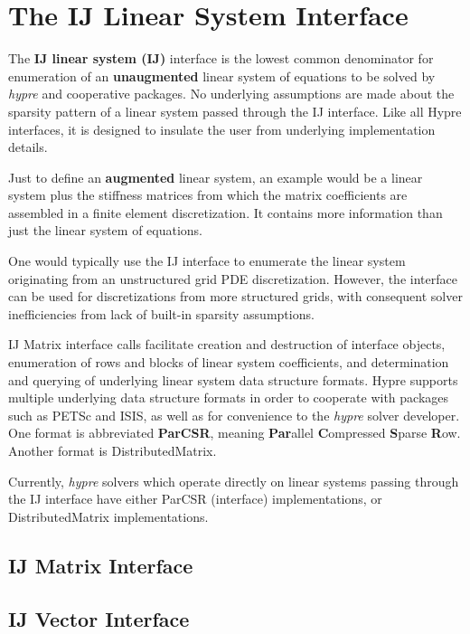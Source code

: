 \chapter{The IJ Linear System Interface}
\label{IJ}

The {\bf IJ linear system (IJ)} interface is the lowest common
denominator
for enumeration of an {\bf unaugmented} linear system of equations
to be solved by {\slshape hypre} and cooperative packages.
No underlying assumptions are made about the sparsity pattern of
a linear system passed through the IJ interface.
Like all Hypre interfaces, it is designed
to insulate the user from underlying implementation details.

Just to define an {\bf augmented} linear system, an example would be
a linear system plus the stiffness matrices from which the matrix
coefficients are assembled in a finite element discretization.
It contains more information than just the linear system
of equations.

One would typically use the IJ interface to enumerate the linear
system originating from an unstructured grid PDE discretization.
However, the interface can be used for discretizations from more
structured grids, with consequent solver inefficiencies from lack
of built-in sparsity assumptions.

IJ Matrix interface calls facilitate creation and destruction of 
interface objects, enumeration of rows and blocks of
linear system coefficients, and determination and querying of
underlying linear system data structure formats.  Hypre supports
multiple underlying data structure formats in order to cooperate
with packages such as PETSc and ISIS, as well as for convenience
to the {\slshape hypre} solver developer.
One format is abbreviated {\bf ParCSR}, meaning {\bf Par}allel
{\bf C}ompressed {\bf S}parse {\bf R}ow.  Another format
is DistributedMatrix.

Currently, {\slshape hypre} solvers which operate directly on linear
systems passing through the IJ interface have either
ParCSR (interface) implementations, or DistributedMatrix
implementations.

\section{IJ Matrix Interface}

\section{IJ Vector Interface}

